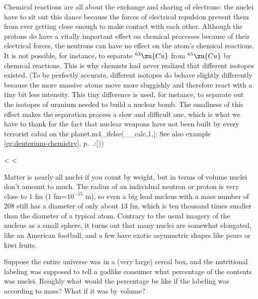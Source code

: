         Chemical reactions are all about the exchange and sharing of
        electrons: the nuclei have to sit out this dance because the
        forces of electrical repulsion prevent them from ever
        getting close enough to make contact with each other.
        Although the protons do have a vitally important effect on
        chemical processes because of their electrical forces, the
        neutrons can have no effect on the atom's chemical
        reactions. It is not possible, for instance, to separate
        $^{63}\zu{Cu}$ from $^{65}\zu{Cu}$ by chemical reactions. This is why
        chemists had never realized that different isotopes existed.
        (To be perfectly accurate, different isotopes do behave
        slightly differently because the more massive atoms move
        more sluggishly and therefore react with a tiny bit less
        intensity. This tiny difference is used, for instance, to
        separate out the isotopes of uranium needed to build a
        nuclear bomb. The smallness of this effect makes the
        separation process a slow and difficult one, which is what
        we have to thank for the fact that nuclear weapons have not
        been built by every terrorist cabal on the planet.m4_ifelse(__calc,1,[: See also example \ref{eg:deuterium-chemistry}, 
        p.~\pageref{eg:deuterium-chemistry}.:]))

    <%
    <%

        Matter is nearly all nuclei if you count by weight, but in
        terms of volume nuclei don't amount to much. The radius of
        an individual neutron or proton is very close to 1 fm (1
        fm=$10^{-15}$  m), so even a big lead nucleus with a mass
        number of 208 still has a diameter of only about 13 fm,
        which is ten thousand times smaller than the diameter of a
        typical atom. Contrary to the usual imagery of the nucleus
        as a small sphere, it turns out that many nuclei are
        somewhat elongated, like an American football, and a few
        have exotic asymmetric shapes like pears or kiwi fruits.


\startdqs

\begin{dq}
        Suppose the entire universe was in a (very large) cereal
        box, and the nutritional labeling was supposed to tell a
        godlike consumer what percentage of the contents was nuclei.
        Roughly what would the percentage be like if the labeling
        was according to mass? What if it was by volume? 
\end{dq}

